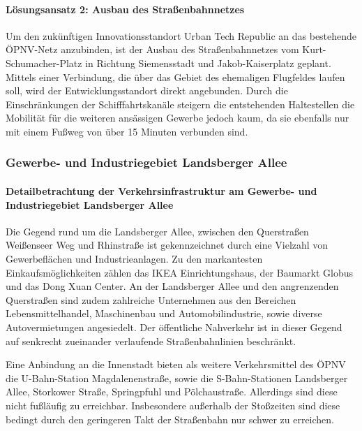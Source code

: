 \paragraph{Lösungsansatz 2: Ausbau des Straßenbahnnetzes}
Um den zukünftigen Innovationsstandort Urban Tech Republic an das bestehende ÖPNV-Netz anzubinden, ist der Ausbau des Straßenbahnnetzes vom Kurt-Schumacher-Platz in Richtung Siemensstadt und Jakob-Kaiserplatz geplant. Mittels einer Verbindung, die über das Gebiet des ehemaligen Flugfeldes laufen soll, wird der Entwicklungsstandort direkt angebunden. Durch die Einschränkungen der Schifffahrtskanäle steigern die entstehenden Haltestellen die Mobilität für die weiteren ansässigen Gewerbe jedoch kaum, da sie ebenfalls nur mit einem Fußweg von über 15 Minuten verbunden sind.

\subsubsection{Gewerbe- und Industriegebiet Landsberger Allee}
\paragraph{Detailbetrachtung der Verkehrsinfrastruktur am Gewerbe- und Industriegebiet Landsberger Allee}
Die Gegend rund um die Landsberger Allee, zwischen den Querstraßen Weißenseer Weg und Rhinstraße ist gekennzeichnet durch eine Vielzahl von Gewerbeflächen und Industrieanlagen. Zu den markantesten Einkaufsmöglichkeiten zählen das IKEA Einrichtungshaus, der Baumarkt Globus und das Dong Xuan Center. An der Landsberger Allee und den angrenzenden Querstraßen sind zudem zahlreiche Unternehmen aus den Bereichen Lebensmittelhandel, Maschinenbau und Automobilindustrie, sowie diverse Autovermietungen angesiedelt. Der öffentliche Nahverkehr ist in dieser Gegend auf senkrecht zueinander verlaufende Straßenbahnlinien beschränkt.


Eine Anbindung an die Innenstadt bieten als weitere Verkehrsmittel des ÖPNV die U-Bahn-Station Magdalenenstraße, sowie die S-Bahn-Stationen Landsberger Allee, Storkower Straße, Springpfuhl und Pölchaustraße. Allerdings sind diese nicht fußläufig zu erreichbar. Insbesondere außerhalb der Stoßzeiten sind diese bedingt durch den geringeren Takt der Straßenbahn nur schwer zu erreichen.

